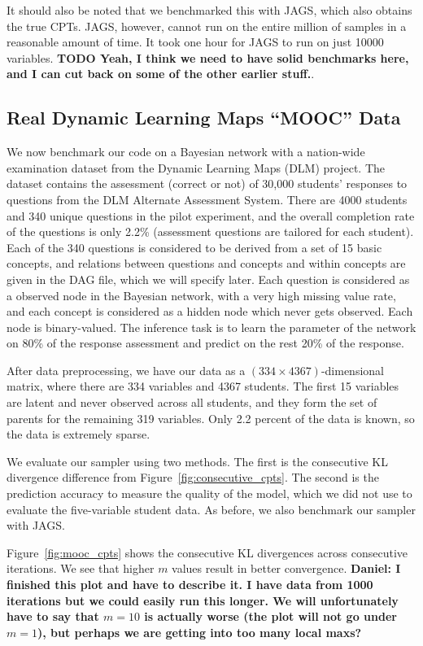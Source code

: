 \documentclass{article} %
\begin{document}
It should also be noted that we benchmarked this with JAGS, which also obtains the true CPTs. JAGS,
however, cannot run on the entire million of samples in a reasonable amount of time. It took one
hour for JAGS to run on just 10000 variables. \textbf{TODO Yeah, I think we need to have solid
benchmarks here, and I can cut back on some of the other earlier stuff.}.

\subsection{Real Dynamic Learning Maps ``MOOC'' Data}\label{ssec:mooc_data}

We now benchmark our code on a Bayesian network with a nation-wide examination dataset from the
Dynamic Learning Maps (DLM) project. The dataset contains the assessment (correct or not) of 30,000
students' responses to questions from the DLM Alternate Assessment System. There are 4000 students
and 340 unique questions in the pilot experiment, and the overall completion rate of the questions
is only 2.2\% (assessment questions are tailored for each student). Each of the 340 questions is
considered to be derived from a set of 15 basic concepts, and relations between questions and
concepts and within concepts are given in the DAG file, which we will specify later.  Each question
is considered as a observed node in the Bayesian network, with a very high missing value rate, and
each concept is considered as a hidden node which never gets observed. Each node is binary-valued.
The inference task is to learn the parameter of the network on 80\% of the response assessment and
predict on the rest 20\% of the response.

After data preprocessing, we have our data as a $(334 \times 4367)$-dimensional matrix, where there
are 334 variables and 4367 students. The first 15 variables are latent and never observed across all
students, and they form the set of parents for the remaining 319 variables. Only 2.2 percent of the
data is known, so the data is extremely sparse.

We evaluate our sampler using two methods. The first is the consecutive KL divergence difference
from Figure~\ref{fig:consecutive_cpts}. The second is the prediction accuracy to measure the quality
of the model, which we did not use to evaluate the five-variable student data. As before, we also
benchmark our sampler with JAGS.

Figure~\ref{fig:mooc_cpts} shows the consecutive KL divergences across consecutive iterations. We
see that higher $m$ values result in better convergence. \textbf{Daniel: I finished this plot and
have to describe it. I have data from 1000 iterations but we could easily run this longer. We will
unfortunately have to say that $m=10$ is actually worse (the plot will not go under $m=1$), but
perhaps we are getting into too many local maxs?}
\end{document}
